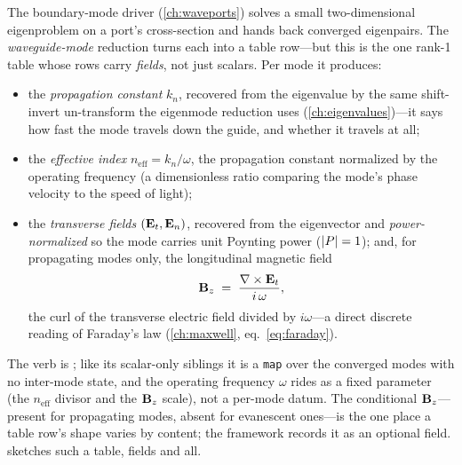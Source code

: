 The boundary-mode driver (\cref{ch:waveports}) solves a small two-dimensional
eigenproblem on a port's cross-section and hands back converged eigenpairs. The
\emph{waveguide-mode} reduction turns each into a table row---but this is the one
rank-1 table whose rows carry \emph{fields}, not just scalars. Per mode it
produces:
\begin{itemize}[nosep]
  \item the \emph{propagation constant} $k_n$, recovered from the eigenvalue by
  the same shift-invert un-transform the eigenmode reduction uses
  (\cref{ch:eigenvalues})---it says how fast the mode travels down the guide, and
  whether it travels at all;
  \item the \emph{effective index} $n_{\text{eff}}=k_n/\omega$, the propagation
  constant normalized by the operating frequency (a dimensionless ratio
  comparing the mode's phase velocity to the speed of light);
  \item the \emph{transverse fields} $(\mathbf{E}_t,\mathbf{E}_n)$, recovered from the
  eigenvector and \emph{power-normalized} so the mode carries unit Poynting power
  ($\lvert P\rvert=1$); and, for propagating modes only, the longitudinal magnetic field
  \begin{equation}
    \mathbf{B}_z \;=\; \frac{\nabla\times\mathbf{E}_t}{i\,\omega},
    \label{eq:Bz}
  \end{equation}
  the curl of the transverse electric field divided by $i\omega$---a direct
  discrete reading of Faraday's law (\cref{ch:maxwell}, eq.~\eqref{eq:faraday}).
\end{itemize}
The verb is ; like its scalar-only siblings it is a
\texttt{map} over the converged modes with no inter-mode state, and the operating
frequency $\omega$ rides as a fixed parameter (the $n_{\text{eff}}$ divisor and
the $\mathbf{B}_z$ scale), not a per-mode datum. The conditional $\mathbf{B}_z$---present for
propagating modes, absent for evanescent ones---is the one place a table row's
shape varies by content; the framework records it as an optional field.
 sketches such a table, fields and all.

